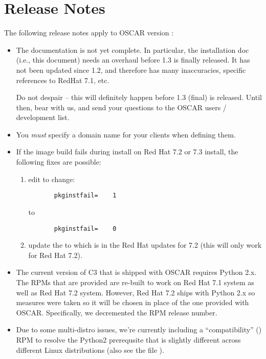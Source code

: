 %
%
%

\section{Release Notes}

The following release notes apply to OSCAR version \oscarversion:

\begin{itemize}
\item The documentation is not yet complete.  In particular, the
  installation doc (i.e., this document) needs an overhaul before 1.3
  is finally released.  It has not been updated since 1.2, and
  therefore has many inaccuracies, specific references to RedHat 7.1,
  etc.
  
  Do not despair -- this will definitely happen before 1.3 (final) is
  released.  Until then, bear with us, and send your questions to the
  OSCAR users / development list.
  
\item You {\em must} specify a domain name for your clients when
  defining them.
  
\item If the image build fails during install on Red Hat 7.2 or 7.3
  install, the following fixes are possible:

  \begin{enumerate}
  \item edit  to
  change:

\begin{verbatim}
       pkginstfail=    1
\end{verbatim}

     to
\begin{verbatim}
       pkginstfail=    0
\end{verbatim}
     
   \item update the  to  which is in
     the Red Hat updates for 7.2 (this will only work for Red Hat 7.2).
  \end{enumerate}
  
\item The current version of C3 that is shipped with OSCAR requires
  Python 2.x.  The RPMs that are provided are re-built to work on Red
  Hat 7.1 system as well as Red Hat 7.2 system.  However, Red Hat 7.2
  ships with Python 2.x so measures were taken so it will be chosen in
  place of the one provided with OSCAR.  Specifically, we decremented
  the RPM release number.
  
\item Due to some multi-distro issues, we're currently including a
  ``compatibility'' () RPM to resolve the
  Python2 prerequsite that is slightly different across different
  Linux distributions (also see the file
  ).

\end{itemize}

